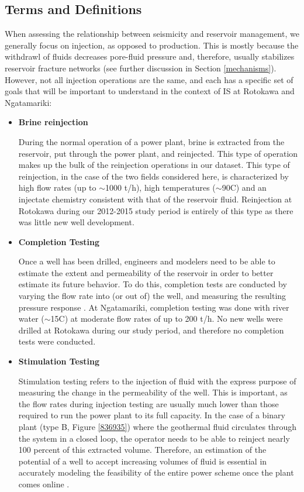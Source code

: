 \subsection{Terms and Definitions}\label{terms}

When assessing the relationship between seismicity and reservoir management, we generally focus on injection, as opposed to production. This is mostly because the withdrawl of fluids decreases pore-fluid pressure and, therefore, usually stabilizes reservoir fracture networks \citep{Segall_1994,Segall_1998}(see further discussion in Section \ref{mechanisms}). However, not all injection operations are the same, and each has a specific set of goals that will be important to understand in the context of IS at Rotokawa and Ngatamariki:
\begin{itemize}
  \item{\textbf{Brine reinjection}}
  
  During the normal operation of a power plant, brine is extracted from the reservoir, put through the power plant, and reinjected. This type of operation makes up the bulk of the reinjection operations in our dataset. This type of reinjection, in the case of the two fields considered here, is characterized by high flow rates (up to $\sim$1000 t/h), high temperatures ($\sim$90\textdegree C) and an injectate chemistry consistent with that of the reservoir fluid. Reinjection at Rotokawa during our 2012-2015 study period is entirely of this type as there was little new well development.
  \item{\textbf{Completion Testing}}
  
  Once a well has been drilled, engineers and modelers need to be able to estimate the extent and permeability of the reservoir in order to better estimate its future behavior. To do this, completion tests are conducted by varying the flow rate into (or out of) the well, and measuring the resulting pressure response \citep{horne1995modern}. At Ngatamariki, completion testing was done with river water ($\sim$15\textdegree C) at moderate flow rates of up to 200 t/h. No new wells were drilled at Rotokawa during our study period, and therefore no completion tests were conducted.
  \item{\textbf{Stimulation Testing}}
  
  Stimulation testing refers to the injection of fluid with the express purpose of measuring the change in the permeability of the well. This is important, as the flow rates during injection testing are usually much lower than those required to run the power plant to its full capacity. In the case of a binary plant (type B, Figure \ref{836935}) where the geothermal fluid circulates through the system in a closed loop, the operator needs to be able to reinject nearly 100 percent of this extracted volume. Therefore, an estimation of the potential of a well to accept increasing volumes of fluid is essential in accurately modeling the feasibility of the entire power scheme once the plant comes online \citep{DiPippo_2016,Grant_2011}.
  

\end{itemize}

